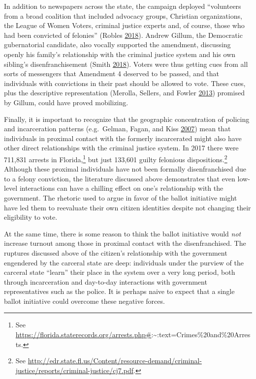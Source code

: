 \documentclass[
  12pt,
]{article}
\begin{document}
In addition to newspapers across the state, the campaign deployed ``volunteers from a broad coalition that included advocacy groups, Christian organizations, the League of Women Voters, criminal justice experts and, of course, those who had been convicted of felonies'' (Robles \protect\hyperlink{ref-Robles2018}{2018}). Andrew Gillum, the Democratic gubernatorial candidate, also vocally supported the amendment, discussing openly his family's relationship with the criminal justice system and his own sibling's disenfranchisement (Smith \protect\hyperlink{ref-Smith2018}{2018}). Voters were thus getting cues from all sorts of messengers that Amendment 4 deserved to be passed, and that individuals with convictions in their past should be allowed to vote. These cues, plus the descriptive representation (Merolla, Sellers, and Fowler \protect\hyperlink{ref-Merolla2013}{2013}) promised by Gillum, could have proved mobilizing.

Finally, it is important to recognize that the geographic concentration of policing and incarceration patterns (e.g.~Gelman, Fagan, and Kiss \protect\hyperlink{ref-Gelman2007}{2007}) mean that individuals in proximal contact with the formerly incarcerated might also have other direct relationships with the criminal justice system. In 2017 there were 711,831 arrests in Florida,\footnote{See \url{https://florida.staterecords.org/arrests.php\#}:\textasciitilde:text=Crimes\%20and\%20Arrests.} but just 133,601 guilty felonious dispositions.\footnote{See \url{http://edr.state.fl.us/Content/resource-demand/criminal-justice/reports/criminal-justice/cj7.pdf}.} Although these proximal individuals have not been formally disenfranchised due to a felony conviction, the literature discussed above demonstrates that even low-level interactions can have a chilling effect on one's relationship with the government. The rhetoric used to argue in favor of the ballot initiative might have led them to reevaluate their own citizen identities despite not changing their eligibility to vote.

At the same time, there is some reason to think the ballot initiative would \emph{not} increase turnout among those in proximal contact with the disenfranchised. The ruptures discussed above of the citizen's relationship with the government engendered by the carceral state are deep: individuals under the purview of the carceral state ``learn'' their place in the system over a very long period, both through incarceration and day-to-day interactions with government representatives such as the police. It is perhaps naive to expect that a single ballot initiative could overcome these negative forces.
\end{document}
